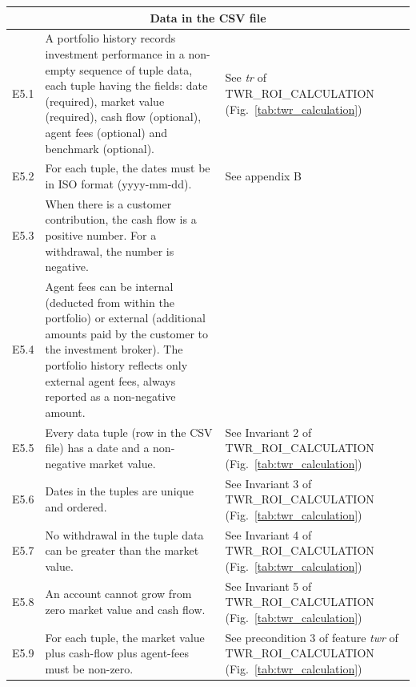 \documentclass[runningheads,12pt]{article}
\begin{document}
{%
\centering
\begin{longtable}{|l|p{9cm}|p{5cm}|}

\hline
\multicolumn{3}{|c|}{\textbf{Data in the CSV file}} \\

\hline
E5.1 & A portfolio history records investment performance in a non-empty sequence of tuple data, each tuple having the fields: date (required), market value (required), cash flow (optional), agent fees (optional) and benchmark (optional). & See \textit{tr} of TWR\_ROI\_CALCULATION (Fig.~\ref{tab:twr_calculation})\\

\hline
E5.2 &  For each tuple, the dates must be in ISO format (yyyy-mm-dd). & See appendix B \\

\hline
E5.3 & When there is a customer contribution, the cash flow is a positive number. For a withdrawal, the number is negative. & \\

\hline
E5.4 & Agent fees can be internal (deducted from within the portfolio) or external (additional amounts paid by the customer to the investment broker). The portfolio history reflects only external agent fees, always reported as a non-negative amount. & \\

\hline
E5.5 & Every data tuple (row in the CSV file) has a date and a non-negative market value. & See Invariant 2 of TWR\_ROI\_CALCULATION (Fig.~\ref{tab:twr_calculation})\\

\hline
E5.6 &  Dates in the tuples are unique and ordered. & See Invariant 3 of TWR\_ROI\_CALCULATION (Fig.~\ref{tab:twr_calculation})\\

\hline
E5.7 & No withdrawal in the tuple data can be greater than the market value. & See Invariant 4 of TWR\_ROI\_CALCULATION (Fig.~\ref{tab:twr_calculation})\\

\hline
E5.8 & An account cannot grow from zero market value and cash flow. & See Invariant 5 of TWR\_ROI\_CALCULATION (Fig.~\ref{tab:twr_calculation})\\

\hline
E5.9 &  For each tuple, the market value plus cash-flow plus agent-fees must be non-zero. & See precondition 3 of feature \textit{twr} of TWR\_ROI\_CALCULATION (Fig.~\ref{tab:twr_calculation})\\

\hline
\end{longtable}
}
\end{document}
